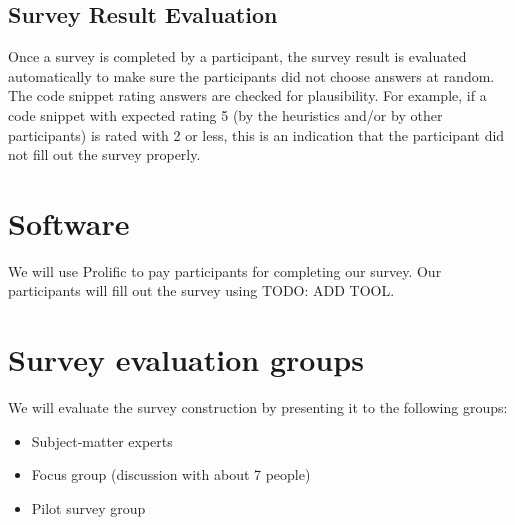 \documentclass[%
class=scrreprt,
chapterprefix=false,%
open=right,%
twoside=false,%
paper=a4,%
logofile={Logo\_zentral\_farbig\_EN.png},%
thesistype=masterproposal,%
UKenglish,%
]{se2thesis}
\begin{document}
\subsection{Survey Result Evaluation}
Once a survey is completed by a participant, the survey result is evaluated automatically to make sure the participants did not choose answers at random. The code snippet rating answers are checked for plausibility. For example, if a code snippet with expected rating 5 (by the heuristics and/or by other participants) is rated with 2 or less, this is an indication that the participant did not fill out the survey properly.

\section{Software}
We will use Prolific to pay participants for completing our survey. Our participants will fill out the survey using TODO: ADD TOOL.

\section{Survey evaluation groups} \label{sec:survey-evaluation}
We will evaluate the survey construction by presenting it to the following groups:
\begin{itemize}
	\item Subject-matter experts
	\item Focus group (discussion with about 7 people)
	\item Pilot survey group
\end{itemize}
\end{document}
